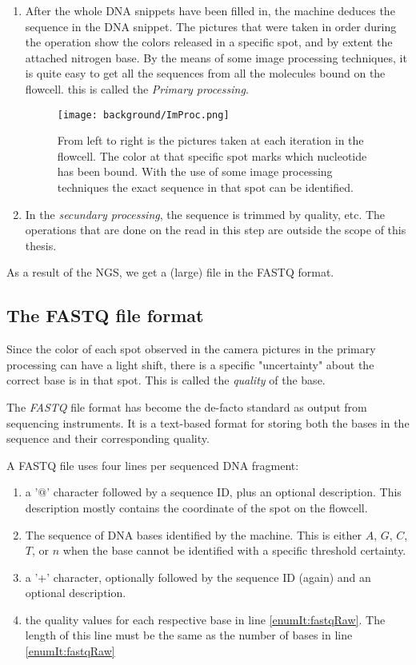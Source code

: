 \begin{enumerate}
	\item After the whole DNA snippets have been filled in, the machine deduces the sequence in the DNA snippet. The pictures that were taken in order during the operation show the colors released in a specific spot, and by extent the attached nitrogen base. By the means of some image processing techniques, it is quite easy to get all the sequences from all the molecules bound on the flowcell. this is called the \emph{Primary processing}.
	
	\begin{figure}[H]
		\centering
		\texttt{[image: background/ImProc.png]}
		\caption{From left to right is the pictures taken at each iteration in the flowcell. The color at that specific spot marks which nucleotide has been bound. With the use of some image processing techniques the exact sequence in that spot can be identified.}
		\label{fig:ImProc}
	\end{figure}
	
	\item In the \emph{secundary processing}, the sequence is trimmed by quality, etc. The operations that are done on the read in this step are outside the scope of this thesis.
\end{enumerate}

As a result of the NGS, we get a (large) file in the FASTQ format.

\subsection{The FASTQ file format}
\label{expl:FASTQ}

Since the color of each spot observed in the camera pictures in the primary processing can have a light shift, there is a specific "uncertainty" about the correct base is in that spot. This is called the \emph{quality} of the base.

The \emph{FASTQ} file format has become the de-facto standard as output from sequencing instruments. It is a text-based format for storing both the bases in the sequence and their corresponding quality.

A FASTQ file uses four lines per sequenced DNA fragment:

\begin{enumerate}
	\item a '$@$' character followed by a sequence ID, plus an optional description. This description mostly contains the coordinate of the spot on the flowcell.
	\item \label{enumIt:fastqRaw} The sequence of DNA bases identified by the machine. This is either $A$, $G$, $C$, $T$, or $n$ when the base cannot be identified with a specific threshold certainty.
	\item a '$+$' character, optionally followed by the sequence ID (again) and an optional description.
	\item the quality values for each respective base in line \ref{enumIt:fastqRaw}. The length of this line must be the same as the number of bases in line \ref{enumIt:fastqRaw}
\end{enumerate}

